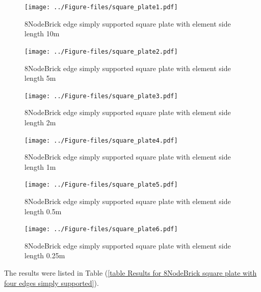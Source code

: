 \documentclass[fleqn,11pt]{article}
\begin{document}
\begin{figure}[H]
  \centering
  \texttt{[image: ../Figure-files/square\_plate1.pdf]}
  \caption{8NodeBrick edge simply supported square plate with element side length 10m }
  \label{fig 8NodeBrick edges simply supported square plate with element side length 10m }
\end{figure}

\newpage

\begin{figure}[H]
  \centering
  \texttt{[image: ../Figure-files/square\_plate2.pdf]}
  \caption{8NodeBrick edge simply supported square plate with element side length 5m }
  \label{fig 8NodeBrick edges simply supported square plate with element side length 5m }
\end{figure}


\begin{figure}[H]
  \centering
  \texttt{[image: ../Figure-files/square\_plate3.pdf]}
  \caption{8NodeBrick edge simply supported square plate with element side length 2m }
  \label{fig 8NodeBrick edges simply supported square plate with element side length 2m }
\end{figure}

\newpage

\begin{figure}[H]
  \centering
  \texttt{[image: ../Figure-files/square\_plate4.pdf]}
  \caption{8NodeBrick edge simply supported square plate with element side length 1m }
  \label{fig 8NodeBrick edges simply supported square plate with element side length 1m }
\end{figure}


\begin{figure}[H]
  \centering
  \texttt{[image: ../Figure-files/square\_plate5.pdf]}
  \caption{8NodeBrick edge simply supported square plate with element side length 0.5m }
  \label{fig 8NodeBrick edges simply supported square plate with element side length 0.5m }
\end{figure}

\newpage

\begin{figure}[H]
  \centering
  \texttt{[image: ../Figure-files/square\_plate6.pdf]}
  \caption{8NodeBrick edge simply supported square plate with element side length 0.25m }
  \label{fig 8NodeBrick edges simply supported square plate with element side length 0.25m }
\end{figure}


The results were listed in Table (\ref{table Results for 8NodeBrick square plate with four edges simply supported}).
\end{document}
